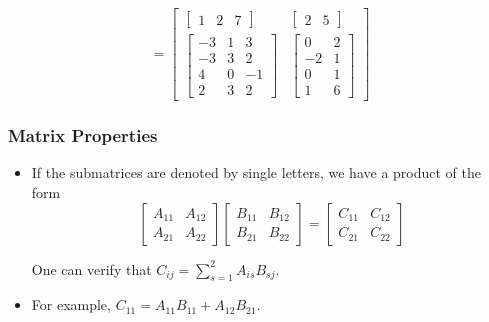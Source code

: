 \documentclass[notheorems,mathserif,table,compress]{beamer}  %
\begin{document}
\begin{frame}
\begin{itemize}
\begin{displaymath}
=
\begin{bmatrix}
\begin{bmatrix}
1 & 2 & 7
\end{bmatrix} &
\begin{bmatrix}
2 & 5
\end{bmatrix}\\
\begin{bmatrix}
-3 & 1 & 3\\
-3 & 3 & 2\\
4 & 0 & -1\\
2 & 3 & 2
\end{bmatrix}&
\begin{bmatrix}
0 & 2\\
-2 & 1 \\
0 & 1\\
1 & 6
\end{bmatrix}
\end{bmatrix}
\end{displaymath}

\end{itemize}
\end{frame}

\begin{frame}
\frametitle{Matrix Properties}
\begin{itemize}
\item If the submatrices are denoted by single letters, we have a product of the form
\begin{displaymath}
\begin{bmatrix}
A_{11} & A_{12}\\
A_{21} & A_{22} 
\end{bmatrix}
\begin{bmatrix}
B_{11} & B_{12}\\
B_{21} & B_{22} 
\end{bmatrix}
=
\begin{bmatrix}
C_{11} & C_{12}\\
C_{21} & C_{22} 
\end{bmatrix}
\end{displaymath}

One can verify that $C_{ij}=\sum_{s=1}^{2}A_{is}B_{sj}$. \\
\item For example, $C_{11}=A_{11}B_{11}+A_{12}B_{21}$.
\end{itemize}
\end{frame}
\end{document}
